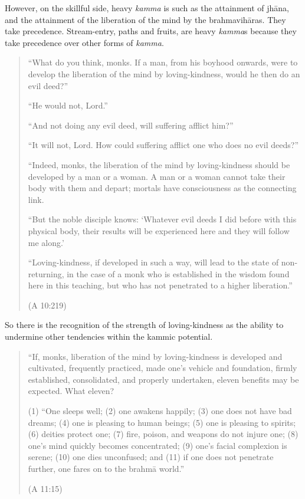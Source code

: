 However, on the skillful side, heavy \emph{kamma} is such as the
attainment of jhāna, and the attainment of the liberation of the mind by
the brahmavihāras. They take precedence. Stream-entry, paths and fruits,
are heavy \emph{kamma}s because they take precedence over other forms of
\emph{kamma}.

\begin{quotation}
“What do you think, monks. If a man, from his boyhood onwards, were to
develop the liberation of the mind by loving-kindness, would he then do
an evil deed?”

“He would not, Lord.”

“And not doing any evil deed, will suffering afflict him?”

“It will not, Lord. How could suffering afflict one who does no evil
deeds?”

“Indeed, monks, the liberation of the mind by loving-kindness should be
developed by a man or a woman. A man or a woman cannot take their body
with them and depart; mortals have consciousness as the connecting link.

“But the noble disciple knows: ‘Whatever evil deeds I did before with
this physical body, their results will be experienced here and they will
follow me along.’

“Loving-kindness, if developed in such a way, will lead to the state of
non-returning, in the case of a monk who is established in the wisdom
found here in this teaching, but who has not penetrated to a higher
liberation.”

(A 10:219)
\end{quotation}

So there is the recognition of the strength of loving-kindness as the
ability to undermine other tendencies within the kammic potential.

\begin{quotation}
“If, monks, liberation of the mind by loving-kindness is developed and
cultivated, frequently practiced, made one’s vehicle and foundation,
firmly established, consolidated, and properly undertaken, eleven
benefits may be expected. What eleven?

(1) “One sleeps well; (2) one awakens happily; (3) one does not have bad
dreams; (4) one is pleasing to human beings; (5) one is pleasing to
spirits; (6) deities protect one; (7) fire, poison, and weapons do not
injure one; (8) one’s mind quickly becomes concentrated; (9) one’s
facial complexion is serene; (10) one dies unconfused; and (11) if one
does not penetrate further, one fares on to the brahmā world.”

(A 11:15)
\end{quotation}

